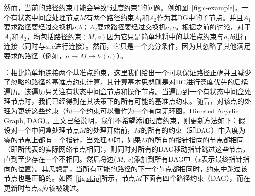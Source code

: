 然而，当前的路径约束可能会导致``过度约束"的问题。例如图~\ref{fig:c-example}，一个有状态中间盒处理节点$M$有两个路径约束$A_1$和$A_2$作为其DG中的子节点。并且$A_1$要求路径要经过交换机$a, b$；$A_2$要求路径要经过交换机$a, c$。根据之前的讨论，对于$A_1$和$A_2$，均包括路径约束$(M, a)$因为它只是简单地将中的基准点约束与$a, b$进行连接（同时与$a, c$进行连接）。然而，它只是一个充分条件，因为其忽略了其他满足要求的路径（例如，$a \rightarrow M \rightarrow b\ (c)$）。


：相比简单地连接两个基准点约束，这里我们给出一个可以保证路径正确并且减少了忽略的路径的基准点约束计算。其计算基本思想则是对DG进行深度优先的后续遍历。该遍历只关注有状态中间盒节点和操作节点。当遍历到一个有状态中间盒处理节点时，我们已经得到在其决策下的所有可能的基准点约束。随后，对该点的处理为更新这些约束（每一个约束可以看作为一个有向无环图，Directed Acyclic Graph, DAG）。上文已经说明，我们不希望添加过度约束，则更新方法如下：假设对一个中间盒处理节点$M$的处理开始前，$M$的所有的约束（即DAG）中入度为零的节点上都有一个指针，当处理$M$时，如果$M$的所有的指针指向的节点都相同（即所代表的实际网络节点相同），则同时对所有的DAG移动指针跳过这些节点，直到至少存在一个不相同。然后将边($M$, $x$)添加到所有DAG中（$x$表示最终指针指向的位置）。其思想是，当所有可能的路径的下一个节点都相同时，约束中跳过该节点也是正确的。如图~\ref{fig:skip}所示，节点$M$下面有四个路径约束（DAG），而在更新时节点$a$应该被跳过。


